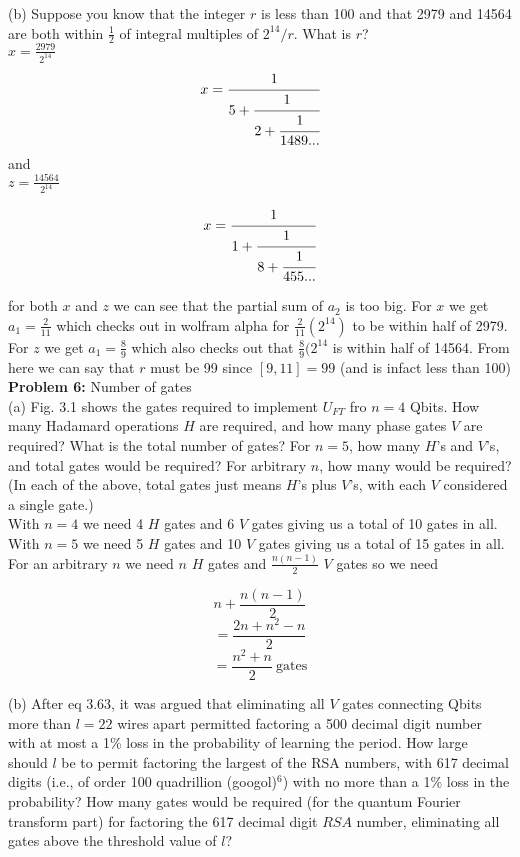 (b) Suppose you know that the integer $r$ is less than 100 and that 2979 and
14564 are both within $\frac{1}{2}$ of integral multiples of $2^{14}/r$.
What is $r$?\\

$x=\frac{2979}{2^{14}}$\\

$$x=\cfrac{1}{5+\cfrac{1}{2+\cfrac{1}{1489...}}}$$
and\\

$z=\frac{14564}{2^{14}}$

$$x=\cfrac{1}{1+\cfrac{1}{8+\cfrac{1}{455...}}}$$

for both $x$ and $z$ we can see that the partial sum of $a_2$ is too big. For
$x$ we get $a_1=\frac{2}{11}$ which checks out in wolfram alpha for
$\frac{2}{11}(2^{14})$ to be within
half of 2979. For $z$ we get $a_1=\frac{8}{9}$ which also checks out that
$\frac{8}{9}(2^{14}$ is within half of 14564. From here we can say that $r$
must be 99 since $[9,11]=99$ (and is infact less than 100)\\


\textbf{Problem 6:} Number of gates\\
(a) Fig. 3.1 shows the gates required to implement $U_{FT}$ fro $n=4$ Qbits. How
many Hadamard operations $H$ are required, and how many phase gates $V$ are
required? What is the total number of gates? For $n=5$, how many $H$'s and
$V$'s, and total gates would be required? For arbitrary $n$, how many would be
required? (In each of the above, total gates just means $H$'s plus $V$'s,
with each $V$ considered a single gate.)\\

With $n=4$ we need 4 $H$ gates and 6 $V$ gates giving us a total of 10 gates in
all. With $n=5$ we need 5 $H$ gates and 10 $V$ gates giving us a total of 15
gates in all. For an arbitrary $n$ we need $n$ $H$ gates and
$\frac{n(n-1)}{2}$ $V$ gates so we need

$$n+\frac{n(n-1)}{2}$$
$$=\frac{2n+n^2-n}{2}$$
$$=\frac{n^2+n}{2}~\text{gates}$$

(b) After eq 3.63, it was argued that eliminating all $V$ gates connecting
Qbits more than $l=22$ wires apart permitted factoring a 500 decimal digit
number with at most a 1\% loss in the probability of learning the period. How
large should $l$ be to permit factoring the largest of the RSA numbers, with 617
decimal digits (i.e., of order 100 quadrillion (googol)$^6$) with no more
than a 1\% loss in the probability? How many gates would be required (for the
quantum Fourier transform part) for factoring the 617 decimal digit $RSA$
number, eliminating all gates above the threshold value of $l$?\\

